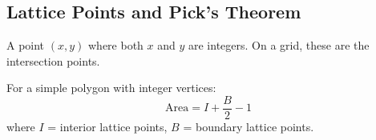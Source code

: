 \subsection{Lattice Points and Pick's Theorem}
\label{ssec:lattice_points_picks}

\begin{definition}
A point $(x,y)$ where both $x$ and $y$ are integers. On a grid, these are the intersection points.
\end{definition}

\begin{theorem}
For a simple polygon with integer vertices:
$$\text{Area} = I + \frac{B}{2} - 1$$
where $I$ = interior lattice points, $B$ = boundary lattice points.
\end{theorem}

\begin{visualexample}
\begin{center}
\end{center}
\end{visualexample} 